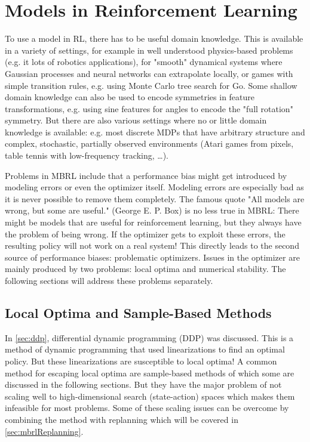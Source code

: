 	\section{Models in Reinforcement Learning}
		To use a model in RL, there has to be useful domain knowledge. This is available in a variety of settings, for example in well understood physics-based problems (e.g. it lots of robotics applications), for "smooth" dynamical systems where Gaussian processes and neural networks can extrapolate locally, or games with simple transition rules, e.g. using Monte Carlo tree search for Go. Some shallow domain knowledge can also be used to encode symmetries in feature transformations, e.g. using sine features for angles to encode the "full rotation" symmetry. But there are also various settings where no or little domain knowledge is available: e.g. most discrete MDPs that have arbitrary structure and complex, stochastic, partially observed environments (Atari games from pixels, table tennis with low-frequency tracking, \dots).

		Problems in MBRL include that a performance bias might get introduced by modeling errors or even the optimizer itself. Modeling errors are especially bad as it is never possible to remove them completely. The famous quote "All models are wrong, but some are useful." (George E. P. Box) is no less true in MBRL: There might be models that are useful for reinforcement learning, but they always have the problem of being wrong. If the optimizer gets to exploit these errors, the resulting policy will not work on a real system! This directly leads to the second source of performance biases: problematic optimizers. Issues in the optimizer are mainly produced by two problems: local optima and numerical stability. The following sections will address these problems separately.

		\subsection{Local Optima and Sample-Based Methods}
			In \autoref{sec:ddp}, differential dynamic programming (DDP) was discussed. This is a method of dynamic programming that used linearizations to find an optimal policy. But these linearizations are susceptible to local optima! A common method for escaping local optima are sample-based methods of which some are discussed in the following sections. But they have the major problem of not scaling well to high-dimensional search (state-action) spaces which makes them infeasible for most problems. Some of these scaling issues can be overcome by combining the method with replanning which will be covered in \autoref{sec:mbrlReplanning}.

